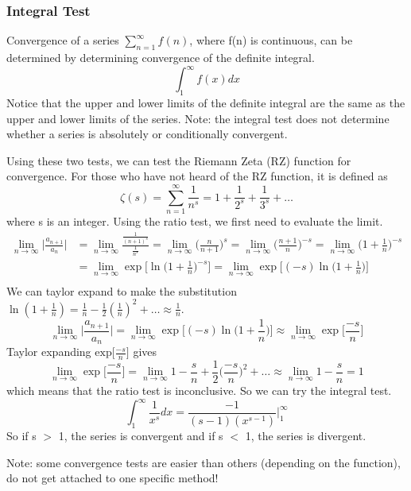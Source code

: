 \documentclass{article}
\newcommand{\be}{\begin{equation}}
\newcommand{\ee}{\end{equation}}
\begin{document}
\subsubsection*{Integral Test}
Convergence of a series $\sum\limits_{n=1}^{\infty} f(n)$, where f(n) is continuous, can be determined by determining convergence of the definite integral.
\be
\int_{1}^{\infty}f(x)dx
\ee
Notice that the upper and lower limits of the definite integral are the same as the upper and lower limits of the series.
Note: the integral test does not determine whether a series is absolutely or conditionally convergent.

Using these two tests, we can test the Riemann Zeta (RZ) function for convergence.
For those who have not heard of the RZ function, it is defined as
\be
\zeta(s) = \sum_{n=1}^{\infty} \frac{1}{n^s} = 1 + \frac{1}{2^s} + \frac{1}{3^s}+ \hdots
\ee
where s is an integer.
Using the ratio test, we first need to evaluate the limit.
\begin{align}
\lim_{n \to \infty} \Big| \frac{a_{n+1}}{a_n} \Big| &= \lim_{n \to \infty} \frac{\frac{1}{(n+1)^s}}{\frac{1}{n^s}} = \lim_{n \to \infty} \Big( \frac{n}{n+1} \Big) ^s
= \lim_{n \to \infty} \Big( \frac{n+1}{n} \Big) ^{-s} = \lim_{n \to \infty} \Big( 1 + \frac{1}{n} \Big) ^{-s} \\
&= \lim_{n \to \infty} \exp \Big[ \ln \Big( 1 + \frac{1}{n} \Big) ^{-s} \Big] = \lim_{n \to \infty} \exp \Big[ (-s) \ln \Big( 1 + \frac{1}{n} \Big) \Big] \\
\end{align}
We can taylor expand to make the substitution $\ln(1 + \frac{1}{n}) = \frac{1}{n} - \frac{1}{2}(\frac{1}{n})^2 + \hdots \approx \frac{1}{n}$.
\be
\lim_{n \to \infty} \Big| \frac{a_{n+1}}{a_n} \Big| = \lim_{n \to \infty} \exp \Big[ (-s) \ln \Big( 1 + \frac{1}{n} \Big) \Big] \approx \lim_{n \to \infty} \exp \Big[ \frac{-s}{n} \Big]
\ee
Taylor expanding $\text{exp} \Big[ \frac{-s}{n} \Big]$ gives
\be
\lim_{n \to \infty} \exp \Big[ \frac{-s}{n} \Big] = \lim_{n \to \infty} 1 - \frac{s}{n} + \frac{1}{2} \Big( \frac{-s}{n} \Big)^2 + \hdots \approx \lim_{n \to \infty} 1 - \frac{s}{n} = 1
\ee
which means that the ratio test is inconclusive. So we can try the integral test.
\be
\int_{1}^{\infty} \frac{1}{x^s} dx = \frac{-1}{(s-1)(x^{s-1})} \Big\vert_{1}^{\infty}
\ee
So if s $>$ 1, the series is convergent and if s $<$ 1, the series is divergent.

Note: some convergence tests are easier than others (depending on the function), do not get attached to one specific method!
\end{document}
